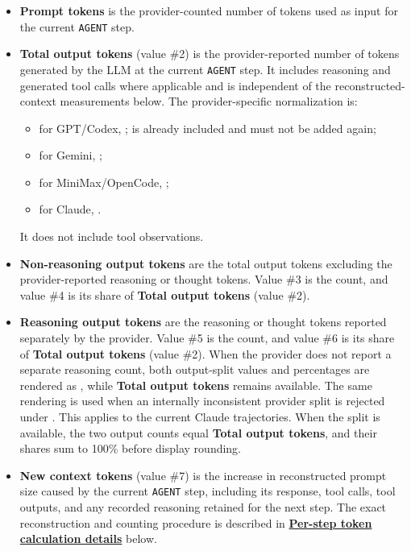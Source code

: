 \documentclass[11pt]{article}
\begin{document}
\begin{itemize}
  \item \textbf{Prompt tokens} is the provider-counted number of tokens used as input for the current \texttt{AGENT} step.

  \item \textbf{Total output tokens} (value \#2) is the provider-reported number of tokens generated by the LLM at the current \texttt{AGENT} step.
  It includes reasoning and generated tool calls where applicable and is independent of the reconstructed-context measurements below.
  The provider-specific normalization is:
  \begin{itemize}
    \item for GPT/Codex, ;  is already included and must not be added again;
    \item for Gemini, ;
    \item for MiniMax/OpenCode, ;
    \item for Claude, .
  \end{itemize}
  It does not include tool observations.

  \item \textbf{Non-reasoning output tokens} are the total output tokens excluding the provider-reported reasoning or thought tokens.
  Value \#3 is the count, and value \#4 is its share of \textbf{Total output tokens} (value \#2).

  \item \textbf{Reasoning output tokens} are the reasoning or thought tokens reported separately by the provider.
  Value \#5 is the count, and value \#6 is its share of \textbf{Total output tokens} (value \#2).
  When the provider does not report a separate reasoning count, both output-split values and percentages are rendered as \code{-}, while \textbf{Total output tokens} remains available.
  The same rendering is used when an internally inconsistent provider split is rejected under .
  This applies to the current Claude trajectories.
  When the split is available, the two output counts equal \textbf{Total output tokens}, and their shares sum to 100\% before display rounding.

  \item \textbf{New context tokens} (value \#7) is the increase in reconstructed prompt size caused by the current \texttt{AGENT} step, including its response, tool calls, tool outputs, and any recorded reasoning retained for the next step.
  The exact reconstruction and counting procedure is described in \hyperref[sec:materialized-agent-step-measurements]{\textbf{Per-step token calculation details}} below.


\end{itemize}
\end{document}
